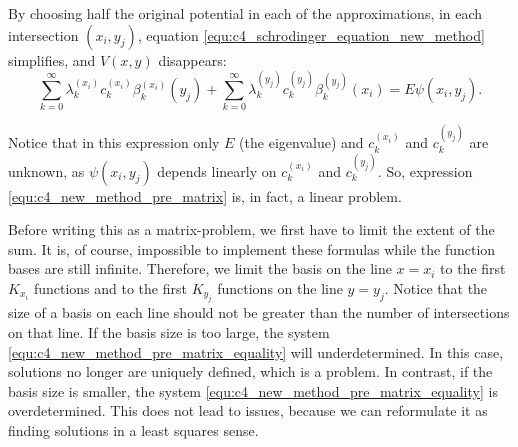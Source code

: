 By choosing half the original potential in each of the approximations, in each intersection $(x_i, y_j)$, equation \eqref{equ:c4_schrodinger_equation_new_method} simplifies, and $V(x, y)$ disappears:
\begin{equation}\label{equ:c4_new_method_pre_matrix}
    \sum_{k=0}^\infty \lambda_k^{(x_i)} c_k^{(x_i)} \beta^{(x_i)}_k(y_j) + \sum_{k=0}^\infty \lambda_k^{(y_j)} c_k^{(y_j)} \beta_k^{(y_j)}(x_i) = E \psi(x_i, y_j) \text{.}
\end{equation}

Notice that in this expression only $E$ (the eigenvalue) and $c_k^{(x_i)}$ and $c_k^{(y_j)}$ are unknown, as $\psi(x_i, y_j)$ depends linearly on $c_k^{(x_i)}$ and $c_k^{(y_j)}$. So, expression \eqref{equ:c4_new_method_pre_matrix} is, in fact, a linear problem.

Before writing this as a matrix-problem, we first have to limit the extent of the sum. It is, of course, impossible to implement these formulas while the function bases are still infinite. Therefore, we limit the basis on the line $x = x_i$ to the first $K_{x_i}$ functions and to the first $K_{y_j}$ functions on the line $y = y_j$. Notice that the size of a basis on each line should not be greater than the number of intersections on that line. If the basis size is too large, the system \eqref{equ:c4_new_method_pre_matrix_equality} will underdetermined. In this case, solutions no longer are uniquely defined, which is a problem. In contrast, if the basis size is smaller, the system \eqref{equ:c4_new_method_pre_matrix_equality} is overdetermined. This does not lead to issues, because we can reformulate it as finding solutions in a least squares sense.

